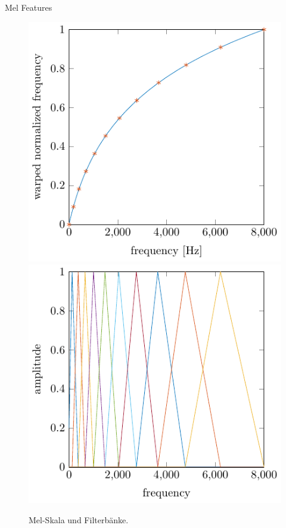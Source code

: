 \documentclass[10pt]{beamer}
\begin{document}
\begin{frame}{Mel Features}
\begin{figure}
\includegraphics[scale=0.55]{../tikz/melScale}
\includegraphics[scale=0.55]{../tikz/melBank}
\caption{Mel-Skala und Filterbänke.}
\end{figure}
\end{frame}
\end{document}
